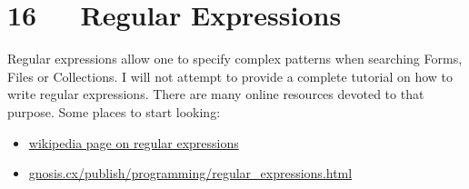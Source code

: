 \documentclass[letterpaper,10pt,english]{sphinxmanual}
\begin{document}
\chapter{16   Regular Expressions}
\label{user_guide:regular-expressions}
Regular expressions allow one to specify complex patterns when searching Forms,
Files or Collections.  I will not attempt to provide a complete tutorial on how
to write regular expressions.  There are many online resources devoted to that
purpose.  Some places to start looking:
\begin{itemize}
\item {} 
\href{http://en.wikipedia.org/wiki/Regular\_expression}{wikipedia page on regular expressions}

\item {} 
\href{http://gnosis.cx/publish/programming/regular\_expressions.html}{gnosis.cx/publish/programming/regular\_expressions.html}

\end{itemize}
\end{document}
